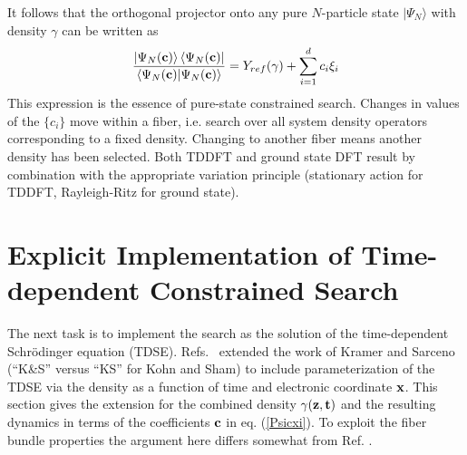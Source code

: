 It follows that the orthogonal projector onto any pure $N$-particle state $%
|\Psi _{N}\rangle $ with density $\gamma $ can be written as 
\begin{equation}
\frac{\left| \Psi _{N}({\bf c})\right\rangle \left\langle \Psi _{N}({\bf c}%
)\right| }{\left\langle \Psi _{N}({\bf c})|\Psi _{N}({\bf c})\right\rangle }%
=Y_{ref}(\gamma )+\sum_{i=1}^{d}c_{i}\xi _{i}  \label{Psicxi}
\end{equation}%
This expression is the essence of pure-state constrained search. Changes in
values of the $\{c_{i}\}$ move within a fiber, i.e. search over all system
density operators corresponding to a fixed density. Changing to another
fiber means another density has been selected. Both TDDFT and ground state
DFT result by combination with the appropriate variation principle
(stationary action for TDDFT, Rayleigh-Ritz for ground state).

\section{Explicit Implementation of Time-dependent Constrained Search}

\noindent The next task is to implement the search as the solution of the
time-dependent Schr\"odinger equation (TDSE). Refs.~\cite%
{BLWSBT99a,BLWSBT00a} extended the work of Kramer and Sarceno \cite{KramSar}
(``K\&S'' versus ``KS'' for Kohn and Sham) to include parameterization of
the TDSE via the density as a function of time and electronic coordinate $%
{\bf x}$. This section gives the extension for the combined density $\gamma (%
{\bf z, t)}$ and the resulting dynamics in terms of the coefficients ${\bf c}
$ in eq. (\ref{Psicxi}). To exploit the fiber bundle properties the argument
here differs somewhat from Ref. \cite{BLWSBT99a}.

